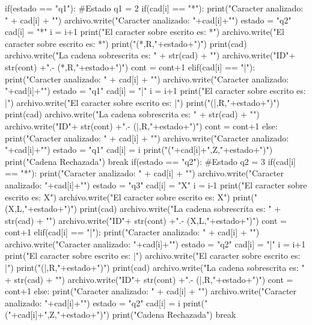 \documentclass{article}
\begin{document}
\begin{python}
					if(estado == "q1"): #Estado q1 = 2
						if(cad[i]  == "*"):
							print("Caracter analizado: " + cad[i] + "\n")
							archivo.write("Caracter analizado: "+cad[i]+"\n")
							estado = "q2"
							cad[i] = "*"                    
							i = i+1
							print("El caracter sobre escrito es: *\n")
							archivo.write("El caracter sobre escrito es: *\n")
							print("(*,R,"+estado+")\n")
							print(cad)
							archivo.write("La cadena sobrescrita es: " + str(cad) + "\n")
							archivo.write("ID"+ str(cont) +".- (*,R,"+estado+")\n\n")
							cont = cont+1
						elif(cad[i] == "|"):
							print("Caracter analizado: " + cad[i] + "\n")
							archivo.write("Caracter analizado: "+cad[i]+"\n")
							estado = "q1"
							cad[i] = "|"
							i = i+1
							print("El caracter sobre escrito es: |\n")
							archivo.write("El caracter sobre escrito es: |\n")
							print("(|,R,"+estado+")\n")
							print(cad)
							archivo.write("La cadena sobrescrita es: " + str(cad) + "\n")
							archivo.write("ID"+ str(cont) +".- (|,R,"+estado+")\n\n")
							cont = cont+1
						else:
							print("Caracter analizado: " + cad[i] + "\n")
							archivo.write("Caracter analizado: "+cad[i]+"\n")
							estado = "q1"
							cad[i] = i
							print("("+cad[i]+",Z,"+estado+")\n")
							print("Cadena Rechazada")
							break
					if(estado == "q2"): #Estado q2 = 3
						if(cad[i] == "*"):
							print("Caracter analizado: " + cad[i] + "\n")
							archivo.write("Caracter analizado: "+cad[i]+"\n")
							estado = "q3"
							cad[i] = "X"
							i = i-1
							print("El caracter sobre escrito es: X\n")
							archivo.write("El caracter sobre escrito es: X\n")
							print("(X,L,"+estado+")\n")
							print(cad)
							archivo.write("La cadena sobrescrita es: " + str(cad) + "\n")
							archivo.write("ID"+ str(cont) +".- (X,L,"+estado+")\n\n")
							cont = cont+1
						elif(cad[i] == "|"):
							print("Caracter analizado: " + cad[i] + "\n")
							archivo.write("Caracter analizado: "+cad[i]+"\n")
							estado = "q2"
							cad[i] = "|"
							i = i+1
							print("El caracter sobre escrito es: |\n")
							archivo.write("El caracter sobre escrito es: |\n")
							print("(|,R,"+estado+")\n")
							print(cad)
							archivo.write("La cadena sobrescrita es: " + str(cad) + "\n")
							archivo.write("ID"+ str(cont) +".- (|,R,"+estado+")\n\n")
							cont = cont+1
						else:
							print("Caracter analizado: " + cad[i] + "\n")
							archivo.write("Caracter analizado: "+cad[i]+"\n")
							estado = "q2"
							cad[i] = i
							print("("+cad[i]+",Z,"+estado+")\n")
							print("Cadena Rechazada")
							break     
				

\end{python}
\end{document}

